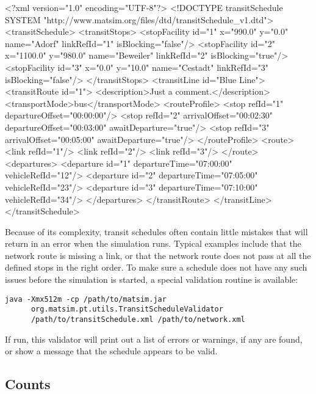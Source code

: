 \begin{xml-file}[caption=An example of a schedule.xml,
label=lst:BuildingScenarios:schedule.xml]
<?xml version="1.0" encoding="UTF-8"?>
<!DOCTYPE transitSchedule SYSTEM "http://www.matsim.org/files/dtd/transitSchedule_v1.dtd">
<transitSchedule>
	<transitStops>
		<stopFacility id="1" x="990.0"  y="0.0"   name="Adorf"    
		                                          linkRefId="1" isBlocking="false"/>
		<stopFacility id="2" x="1100.0" y="980.0" name="Beweiler" 
		                                          linkRefId="2" isBlocking="true"/>
		<stopFacility id="3" x="0.0"    y="10.0"  name="Cestadt"  
		                                          linkRefId="3" isBlocking="false"/>
	</transitStops>
	<transitLine id="Blue Line">
		<transitRoute id="1">
			<description>Just a comment.</description>
			<transportMode>bus</transportMode>
			<routeProfile>
				<stop refId="1" departureOffset="00:00:00"/>
				<stop refId="2" arrivalOffset="00:02:30" departureOffset="00:03:00" 
				                                         awaitDeparture="true"/>
				<stop refId="3" arrivalOffset="00:05:00" awaitDeparture="true"/>
			</routeProfile>
			<route>
				<link refId="1"/>
				<link refId="2"/>
				<link refId="3"/>
			</route>
			<departures>
				<departure id="1" departureTime="07:00:00" vehicleRefId="12"/>
				<departure id="2" departureTime="07:05:00" vehicleRefId="23"/>
				<departure id="3" departureTime="07:10:00" vehicleRefId="34"/>
			</departures>
		</transitRoute>
	</transitLine>
</transitSchedule>
\end{xml-file}

Because of its complexity, transit schedules often contain little mistakes that
will return in an error when the simulation runs. Typical examples include that
the network route is missing a link, or that the network route does not pass at
all the defined stops in the right order. To make sure a schedule does not have
any such issues before the simulation is started, a special validation routine
is available:

\begin{verbatim}
java -Xmx512m -cp /path/to/matsim.jar 
      org.matsim.pt.utils.TransitScheduleValidator
      /path/to/transitSchedule.xml /path/to/network.xml
\end{verbatim}

If run, this validator will print out a list of errors or warnings, if any are
found, or show a message that the schedule appears to be valid.

\subsection{Counts}

